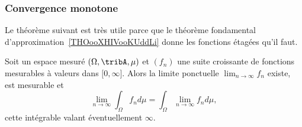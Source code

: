 \subsubsection{Convergence monotone}

Le théorème suivant est très utile parce que le théorème fondamental d'approximation~\ref{THOooXHIVooKUddLi} donne les fonctions étagées qu'il faut.

\begin{theorem} \label{ThoRRDooFUvEAN}
    Soit un espace mesuré \( (\Omega,\tribA,\mu)\) et \( (f_n)\) une suite croissante de fonctions mesurables à valeurs dans \( \mathopen[ 0 , \infty \mathclose]\). Alors la limite ponctuelle \( \lim_{n\to \infty} f_n\) existe, est mesurable et
    \begin{equation}    \label{EqFHqCmLV}
        \lim_{n\to \infty} \int_{\Omega}f_nd\mu= \int_{\Omega}\lim_{n\to \infty} f_nd\mu,
    \end{equation}
    cette intégrable valant éventuellement \( \infty\).
\end{theorem}

